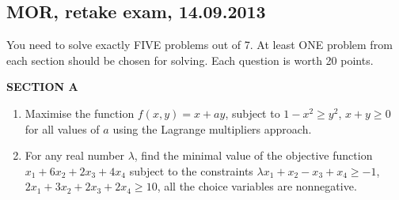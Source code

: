 \begin{comment}
\vspace{20pt}
\textbf{SECTION C}
\vspace{20pt}

\begin{enumerate}[resume]
\item Find all pure and mixed Nash equilibria in the following bimatrix game:


\begin{tabular}{c|ccc}
 & d & e & f \\
\hline
a & 4;5 & 2;4 & 2;1  \\
b & 2;7 & 9;5 & 1;8  \\
c & 0;1 & 3;0 & 7;5  \\
\end{tabular}


\item There is an auction of a painting with two players. The value of the painting for the first player is a random variable $v_1$, for the second player --- $v_2$. The random variables $v_1$ and $v_2$ are independent and uniformly distributed from 0 to 1 million dollars. Each player makes the bid $b_i$ knowing only his own value of the painting. The player who makes the highest bid gets the painting and pays the arithmetic mean of the two bids.

Find a Nash equilibrium where each player uses linear strategy of the form $b_i=k\cdot v_i$.

\end{enumerate}

\end{comment}


\subsection{MOR, retake exam, 14.09.2013}


You need to solve exactly FIVE problems out of 7. At least ONE problem from each section should be chosen for solving. Each question is worth 20 points.

\vspace{20pt}
\textbf{SECTION A}
\vspace{20pt}

\begin{enumerate}
\item Maximise the function $f(x,y)=x+ay$, subject to $1-x^2\geq y^2$, $x+y \geq 0$ for all values of $a$ using the Lagrange multipliers approach.

\item For any real number $\lambda$, find the minimal value of the objective function $x_1+6x_2+2x_3+4x_4$ subject to the constraints  $\lambda x_1+x_2-x_3+x_4\geq -1$, $2x_1+3x_2+2x_3+2x_4 \geq 10$,  all the choice variables are nonnegative.
\end{enumerate}

